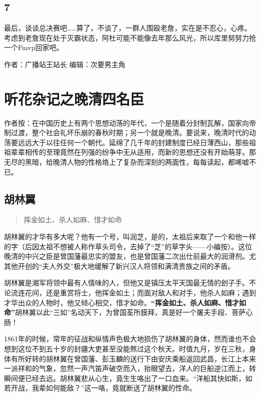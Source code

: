 \documentclass[]{book}
\begin{document}
\subsection{7}\label{section-5}

最后，谈谈总决赛吧\ldots{}\ldots{}算了，不谈了，一群人围殴老詹，实在是不忍心，心疼。考虑到老詹现在处于灭霸状态，阿杜可能不能像去年那么风光，所以库里努努力抢一个Fmvp回家吧。

作者：广播站王站长 编辑：次要男主角

\section{听花杂记之晚清四名臣}

作者按：在中国历史上有两个思想动荡的年代，一个是随着分封制瓦解，国家向帝制过渡，整个社会礼坏乐崩的春秋时期；另一个就是晚清。要说来，晚清时代的动荡要远远大于以往任何一个朝代。延绵了几千年的封建制度已经日薄西山，那些祖祖辈辈相传的至理竟然在列强的纷争中无从适用，而新的思想还没有开始萌芽。那无尽的黑暗，给晚清人物的性格烙上了复杂而深刻的两面性，每每读起，都唏嘘不已。

\subsection{胡林翼}

\begin{quote}
挥金如土、杀人如麻、惜才如命
\end{quote}

胡林翼的才华有多大呢？他有一个号，叫润芝，是的，太祖后来取了一个和他一样的字（后因太祖不想被人称作草头司令，去掉了``芝''的草字头------小编按）。这位晚清的中兴之臣是曾国藩最忠实的盟友，也是曾国藩二次出仕前最大的润滑剂。尤其他开创的``夫人外交''极大地缓解了新兴汉人将领和满清贵族之间的矛盾。

胡林翼是湘军将领中最有人情味的人，但他又是镇压太平天国最无情的刽子手。不论流连花间，还是重赏将士，他挥金如土；而面对敌人和对手，他杀人如麻；遇到才华出众的人物时，他又倾心相交，惜才如命。\textbf{``挥金如土、杀人如麻、惜才如命''}胡林翼以此``三如''名动天下，为曾国荃所膜拜，真是好一个屠夫手段、菩萨心肠！

1861年的时候，常年的征战和纵情声色极大地损伤了胡林翼的身体，然而谁也不会想到这位不到五十岁的封疆大吏甚至没能熬过这个秋天。时值九月，岁在三秋，身体有所好转的胡林翼在曾国藩、彭玉麟的送行下由安庆乘船返回武昌，长江上本来一派祥和的气象，忽然一声汽笛声破空而入，抬眼望去，洋人的巨船逆江而上，转瞬间便已经去远。胡林翼悲从心生，竟生生咯出了一口血来。``洋船其快如斯，如若开战，我辈如何能敌？''这一咯，竟就断送了胡林翼的性命。
\end{document}
